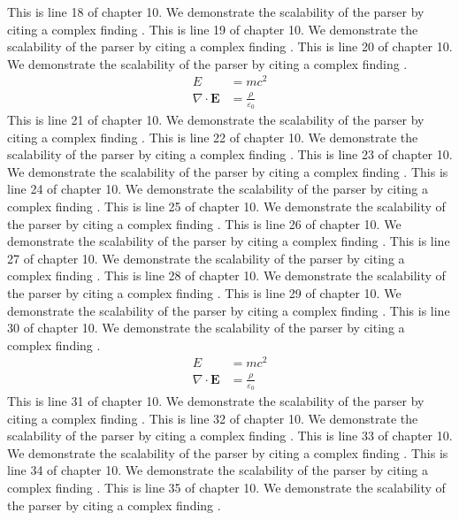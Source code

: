 This is line 18 of chapter 10. We demonstrate the scalability of the parser by citing a complex finding \cite{ref10_18}.
This is line 19 of chapter 10. We demonstrate the scalability of the parser by citing a complex finding \cite{ref10_19}.
This is line 20 of chapter 10. We demonstrate the scalability of the parser by citing a complex finding \cite{ref10_20}.
\begin{align*}
  E &= mc^2 \\
  \nabla \cdot \mathbf{E} &= \frac{\rho}{\varepsilon_0}
\end{align*}
This is line 21 of chapter 10. We demonstrate the scalability of the parser by citing a complex finding \cite{ref10_21}.
This is line 22 of chapter 10. We demonstrate the scalability of the parser by citing a complex finding \cite{ref10_22}.
This is line 23 of chapter 10. We demonstrate the scalability of the parser by citing a complex finding \cite{ref10_23}.
This is line 24 of chapter 10. We demonstrate the scalability of the parser by citing a complex finding \cite{ref10_24}.
This is line 25 of chapter 10. We demonstrate the scalability of the parser by citing a complex finding \cite{ref10_25}.
This is line 26 of chapter 10. We demonstrate the scalability of the parser by citing a complex finding \cite{ref10_26}.
This is line 27 of chapter 10. We demonstrate the scalability of the parser by citing a complex finding \cite{ref10_27}.
This is line 28 of chapter 10. We demonstrate the scalability of the parser by citing a complex finding \cite{ref10_28}.
This is line 29 of chapter 10. We demonstrate the scalability of the parser by citing a complex finding \cite{ref10_29}.
This is line 30 of chapter 10. We demonstrate the scalability of the parser by citing a complex finding \cite{ref10_30}.
\begin{align*}
  E &= mc^2 \\
  \nabla \cdot \mathbf{E} &= \frac{\rho}{\varepsilon_0}
\end{align*}
This is line 31 of chapter 10. We demonstrate the scalability of the parser by citing a complex finding \cite{ref10_31}.
This is line 32 of chapter 10. We demonstrate the scalability of the parser by citing a complex finding \cite{ref10_32}.
This is line 33 of chapter 10. We demonstrate the scalability of the parser by citing a complex finding \cite{ref10_33}.
This is line 34 of chapter 10. We demonstrate the scalability of the parser by citing a complex finding \cite{ref10_34}.
This is line 35 of chapter 10. We demonstrate the scalability of the parser by citing a complex finding \cite{ref10_35}.
